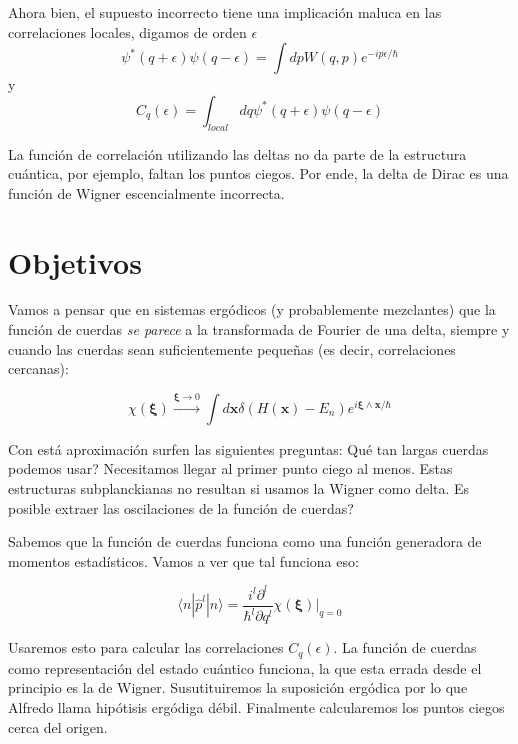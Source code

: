 \documentclass[a4paper,10pt]{article}
\newcommand{\xfase}{\mathbf{x}}
\newcommand{\xifase}{ {\boldsymbol{\xi}} }
\newcommand{\bra}[1]{\langle #1|}
\newcommand{\ket}[1]{|#1\rangle}
\begin{document}
Ahora bien, el supuesto incorrecto tiene una implicación maluca
en las correlaciones locales, digamos de orden $\epsilon$
\begin{equation}
\psi^*(q+\epsilon)\psi(q-\epsilon)=\int dp W(q,p)e^{-ip\epsilon/\hbar}
\end{equation}
y
\begin{equation}
C_q(\epsilon)=\int_{local} dq \psi^*(q+\epsilon)\psi(q-\epsilon)
\end{equation}

La función de correlación utilizando las deltas no da parte de la
estructura cuántica, por ejemplo, faltan los puntos ciegos. Por
ende, la delta de Dirac es una función de Wigner escencialmente 
incorrecta. 


\section{Objetivos}

Vamos a pensar que en sistemas ergódicos (y probablemente mezclantes)
que la función de cuerdas \emph{se parece} a la transformada de
Fourier de una delta, siempre y cuando las cuerdas sean suficientemente
pequeñas (es decir, correlaciones cercanas):

\begin{equation}
\chi(\xifase)\xrightarrow{\xifase\rightarrow 0}
\int d\xfase \delta(H(\xfase)-E_n) e^{i\xifase\wedge\xfase/\hbar}
\end{equation}

Con está aproximación surfen las siguientes preguntas:
Qué tan largas cuerdas podemos usar? Necesitamos llegar al primer
punto ciego al menos. Estas estructuras subplanckianas no
resultan si usamos la Wigner como delta. 
Es posible extraer las oscilaciones de la función de cuerdas?


Sabemos que la función de cuerdas funciona como una función 
generadora de momentos estadísticos. Vamos a ver que tal funciona eso:

\begin{equation}
\bra{n}\hat{p}^l\ket{n}=\frac{i^l \partial ^l}{\hbar^l \partial q^l}
\chi(\xifase) \lvert_{q=0}
\end{equation}


Usaremos esto para calcular las correlaciones $C_q(\epsilon)$.
La función de cuerdas como representación del estado cuántico
funciona, la que esta errada desde el principio es la de Wigner.
Susutituiremos la suposición ergódica por lo que Alfredo llama
hipótisis ergódiga débil. 
Finalmente calcularemos los puntos ciegos cerca del origen.



\end{document}
